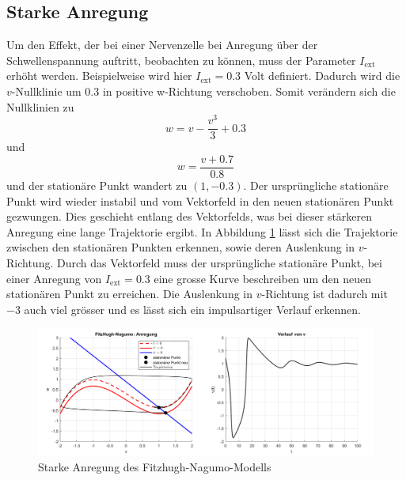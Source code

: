 \begin{refsection}
\subsection{Starke Anregung}
Um den Effekt, der bei einer Nervenzelle bei Anregung über der Schwellenspannung auftritt, beobachten zu können, muss
der Parameter $I_\text{ext}$ erhöht werden.
Beispielweise wird hier $I_\text{ext} = 0.3$ Volt definiert.
Dadurch wird die $v$-Nullklinie um 0.3 in positive w-Richtung verschoben.
Somit verändern sich die Nullklinien zu 
\[ w = v - \frac{v^3}{3} + 0.3\]
und \[w = \frac{v + 0.7}{0.8}\] und der stationäre Punkt wandert zu $(1 ,-0.3)$.
Der ursprüngliche stationäre Punkt wird wieder instabil und vom Vektorfeld in den neuen stationären Punkt
gezwungen.
Dies geschieht entlang des Vektorfelds, was bei dieser stärkeren Anregung eine lange Trajektorie ergibt.
In Abbildung \ref{fig:starkeAnregung} lässt sich die Trajektorie zwischen den stationären Punkten erkennen, sowie
deren Auslenkung in $v$-Richtung.
Durch das Vektorfeld muss der ursprüngliche stationäre Punkt, bei einer Anregung von $I_\text{ext} = 0.3$ eine grosse Kurve
beschreiben um den neuen stationären Punkt zu erreichen.
Die Auslenkung in $v$-Richtung ist dadurch mit $-3$ auch viel grösser und es lässt sich ein impulsartiger Verlauf erkennen.
\begin{figure}[H]
    \centering
    \includegraphics[width=\textwidth]{papers/nerven/Bilder/starkeAnregung.png}
    \caption{Starke Anregung des Fitzhugh-Nagumo-Modells}
    \label{fig:starkeAnregung}
\end{figure}

\end{refsection}
